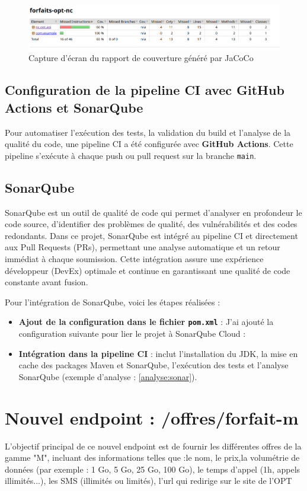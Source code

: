 \documentclass[11pt]{article}
\begin{document}
		\begin{figure}[h!]
			\centering
			\includegraphics[width=\textwidth]{asset/jacoco.png}
			\caption{Capture d'écran du rapport de couverture généré par JaCoCo}
			\label{fig:jacoco-report}
		\end{figure}
		
		\subsection{Configuration de la pipeline CI avec GitHub Actions et SonarQube}
		Pour automatiser l'exécution des tests, la validation du build et l'analyse de la qualité du code, une pipeline CI a été configurée avec \textbf{GitHub Actions}. Cette pipeline s'exécute à chaque push ou pull request sur la branche \texttt{main}.
		
		\subsection{SonarQube}
		SonarQube est un outil de qualité de code qui permet d'analyser en profondeur le code source, d'identifier des problèmes de qualité, des vulnérabilités et des codes redondants. Dans ce projet, SonarQube est intégré au pipeline CI et directement aux Pull Requests (PRs), permettant une analyse automatique et un retour immédiat à chaque soumission. Cette intégration assure une expérience développeur (DevEx) optimale et continue en garantissant une qualité de code constante avant fusion.
		
		Pour l'intégration de SonarQube, voici les étapes réalisées :
		\begin{itemize}
			\item \textbf{Ajout de la configuration dans le fichier \texttt{pom.xml}} : J'ai ajouté la configuration suivante pour lier le projet à SonarQube Cloud :

		
			\item\textbf{Intégration dans la pipeline CI} : inclut l'installation du JDK, la mise en cache des packages Maven et SonarQube, l'exécution des tests et l'analyse SonarQube (exemple d'analyse : \ref{analyse:sonar}).
		\end{itemize}
		\section{Nouvel endpoint : /offres/forfait-m}
		L'objectif principal de ce nouvel endpoint est de fournir les différentes offres de la gamme "M", incluant des informations telles que :le nom, le prix,la volumétrie de données (par exemple : 1 Go, 5 Go, 25 Go, 100 Go), le temps d'appel (1h, appels illimités...), les SMS (illimités ou limités), l'url qui redirige sur le site de l'OPT
	
\end{document}
